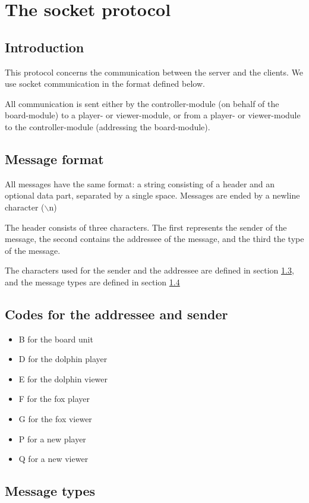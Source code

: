 \documentclass[a4paper,twoside,11pt]{book}
\begin{document}
\section{The socket protocol}

\subsection{Introduction}
This protocol concerns the communication between the server and the clients. We use socket communication in the format defined below.

All communication is sent either by the controller-module (on behalf of the board-module) to a player- or viewer-module, or from a player- or viewer-module to the controller-module (addressing the board-module).

\subsection{Message format}
All messages have the same format: a string consisting of a header and an optional data part, separated by a single space. Messages are ended by a newline character ({$\backslash$}n)

The header consists of three characters. The first represents the sender of the message, the second contains the addressee of the message, and the third the type of the message.

The characters used for the sender and the addressee are defined in section \ref{addresseecodes}, and the message types are defined in section \ref{messagetypes}

\subsection{Codes for the addressee and sender}
\label{addresseecodes}
\begin{itemize}
\item B for the board unit
\item D for the dolphin player
\item E for the dolphin viewer
\item F for the fox player
\item G for the fox viewer
\item P for a new player
\item Q for a new viewer
\end{itemize}

\subsection{Message types}
\label{messagetypes}
\end{document}

